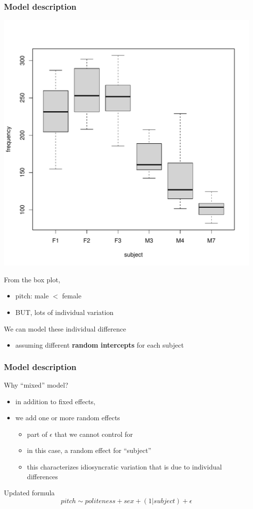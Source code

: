 \documentclass[10p]{beamer}\usepackage[]{graphicx}\usepackage[]{color}
\begin{document}
\begin{frame}
\frametitle{Model description}
\begin{center}
\includegraphics[scale=.25]{figure/box_subject-1}
\end{center}
From the box plot,
\begin{itemize}
\item pitch: male $<$ female
\item BUT, lots of individual variation
\end{itemize}

We can model these individual difference
\begin{itemize}
\item assuming different \textbf{random intercepts} for each subject
\end{itemize}
\end{frame}

\begin{frame}
\frametitle{Model description}
Why ``mixed'' model?
\begin{itemize}
\item{in addition to fixed effects,}
\item{we add one or more random effects}
  \begin{itemize}
  \item part of $\epsilon$ that we cannot control for
  \item in this case, a random effect for ``subject''
  \item this characterizes idiosyncratic variation that is due to individual differences
  \end{itemize}
\end{itemize}
Updated formula
\begin{displaymath}
pitch \sim politeness + sex + (1|subject) + \epsilon
\end{displaymath}
\end{frame}
\end{document}
